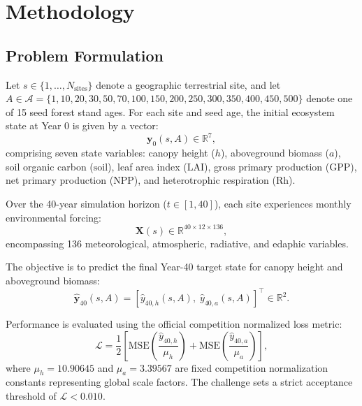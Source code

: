 \documentclass[conference]{IEEEtran}
\begin{document}
\section{Methodology}

\subsection{Problem Formulation}
Let $s \in \{1, \dots, N_{\text{sites}}\}$ denote a geographic terrestrial site, and let $A \in \mathcal{A} = \{1, 10, 20, 30, 50, 70, 100, 150, 200, 250, 300, 350, 400, 450, 500\}$ denote one of 15 seed forest stand ages. For each site and seed age, the initial ecosystem state at Year 0 is given by a vector:
\begin{equation}
    \mathbf{y}_0(s, A) \in \mathbb{R}^7,
\end{equation}
comprising seven state variables: canopy height ($h$), aboveground biomass ($a$), soil organic carbon ($\text{soil}$), leaf area index ($\text{LAI}$), gross primary production ($\text{GPP}$), net primary production ($\text{NPP}$), and heterotrophic respiration ($\text{Rh}$).

Over the 40-year simulation horizon ($t \in [1, 40]$), each site experiences monthly environmental forcing:
\begin{equation}
    \mathbf{X}(s) \in \mathbb{R}^{40 \times 12 \times 136},
\end{equation}
encompassing 136 meteorological, atmospheric, radiative, and edaphic variables.

The objective is to predict the final Year-40 target state for canopy height and aboveground biomass:
\begin{equation}
    \hat{\mathbf{y}}_{40}(s, A) = \left[ \hat{y}_{40, h}(s, A), \; \hat{y}_{40, a}(s, A) \right]^\top \in \mathbb{R}^2.
\end{equation}

Performance is evaluated using the official competition normalized loss metric:
\begin{equation}
    \mathcal{L} = \frac{1}{2} \left[ \text{MSE}\left(\frac{\hat{y}_{40, h}}{\mu_h}\right) + \text{MSE}\left(\frac{\hat{y}_{40, a}}{\mu_a}\right) \right],
    \label{eq:metric}
\end{equation}
where $\mu_h = 10.90645$ and $\mu_a = 3.39567$ are fixed competition normalization constants representing global scale factors. The challenge sets a strict acceptance threshold of $\mathcal{L} < 0.010$.
\end{document}
